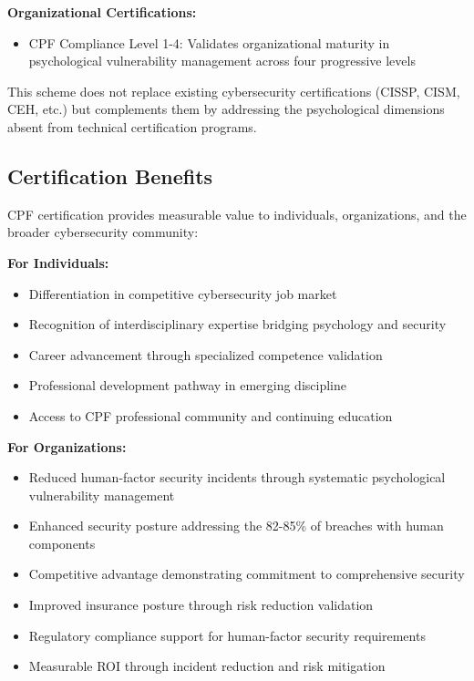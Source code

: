 \documentclass[11pt,a4paper]{article}
\begin{document}
\textbf{Organizational Certifications:}
\begin{itemize}
\item CPF Compliance Level 1-4: Validates organizational maturity in psychological vulnerability management across four progressive levels
\end{itemize}

This scheme does not replace existing cybersecurity certifications (CISSP, CISM, CEH, etc.) but complements them by addressing the psychological dimensions absent from technical certification programs.

\subsection{Certification Benefits}

CPF certification provides measurable value to individuals, organizations, and the broader cybersecurity community:

\textbf{For Individuals:}
\begin{itemize}
\item Differentiation in competitive cybersecurity job market
\item Recognition of interdisciplinary expertise bridging psychology and security
\item Career advancement through specialized competence validation
\item Professional development pathway in emerging discipline
\item Access to CPF professional community and continuing education
\end{itemize}

\textbf{For Organizations:}
\begin{itemize}
\item Reduced human-factor security incidents through systematic psychological vulnerability management
\item Enhanced security posture addressing the 82-85\% of breaches with human components
\item Competitive advantage demonstrating commitment to comprehensive security
\item Improved insurance posture through risk reduction validation
\item Regulatory compliance support for human-factor security requirements
\item Measurable ROI through incident reduction and risk mitigation
\end{itemize}
\end{document}
